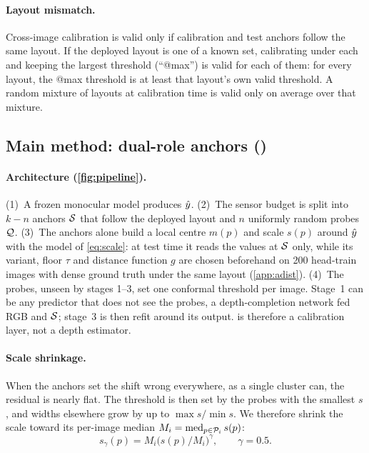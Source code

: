 \paragraph{Layout mismatch.}
Cross-image calibration is valid only if calibration and test anchors follow the same layout.
If the deployed layout is one of a known set, calibrating under each and keeping the largest threshold (``@max'') is valid for each of them: for every layout, the @max threshold is at least that layout's own valid threshold.
A random mixture of layouts at calibration time is valid only on average over that mixture.

\subsection{Main method: dual-role anchors (\mDual)}
\label{sec:method:dual}



\paragraph{Architecture (\cref{fig:pipeline}).}
(1)~A frozen monocular model produces $\hat{y}$.
(2)~The sensor budget is split into $k-n$ anchors $\mathcal{S}$ that follow the deployed layout and $n$ uniformly random probes $\mathcal{Q}$.
(3)~The anchors alone build a local centre $m(p)$ and scale $s(p)$ around $\hat{y}$ with the \mDist model of \cref{eq:scale}: at test time it reads the values at $\mathcal{S}$ only, while its variant, floor $\tau$ and distance function $g$ are chosen beforehand on 200 head-train images with dense ground truth under the same layout (\cref{app:adist}).
(4)~The probes, unseen by stages 1--3, set one conformal threshold per image.
Stage~1 can be any predictor that does not see the probes, \eg a depth-completion network fed RGB and $\mathcal{S}$; stage~3 is then refit around its output.
\mDual is therefore a calibration layer, not a depth estimator.

\paragraph{Scale shrinkage.}
When the anchors set the shift wrong everywhere, as a single cluster can, the residual is nearly flat.
The threshold is then set by the probes with the smallest $s$, and widths elsewhere grow by up to $\max s/\min s$.
We therefore shrink the scale toward its per-image median $M_i=\operatorname{med}_{p\in\mathcal{P}_i}s(p)$:
\begin{equation}
s_\gamma(p)=M_i\big(s(p)/M_i\big)^{\gamma},\qquad\gamma=0.5.
\label{eq:shrink}
\end{equation}

